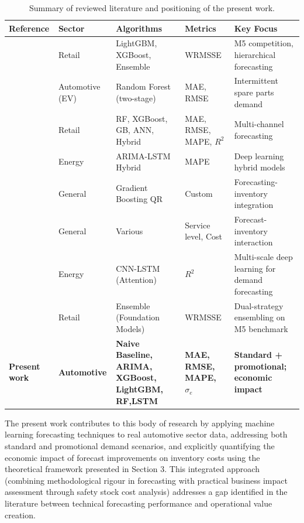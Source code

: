 \documentclass[ENG]{TFUOC}%
\begin{document}
\begin{table}[H]
\centering
\small
\caption{Summary of reviewed literature and positioning of the present work.}
\label{tab:literature_summary}
\begin{tabular}{
    |>{\raggedright\arraybackslash}p{2.6cm}
    |>{\raggedright\arraybackslash}p{2.4cm}
    |>{\raggedright\arraybackslash}p{2.4cm}
    |>{\raggedright\arraybackslash}p{2.0cm}
    |>{\raggedright\arraybackslash}p{2.6cm}|}
\hline
\textbf{Reference} & \textbf{Sector} & \textbf{Algorithms} & \textbf{Metrics} & \textbf{Key Focus} \\
\hline
\citet{makridakis2021m5} & Retail & LightGBM, XGBoost, Ensemble & WRMSSE & M5 competition, hierarchical forecasting \\
\hline
\citet{fu2026treebased} & Automotive (EV) & Random Forest (two-stage) & MAE, RMSE & Intermittent spare parts demand \\
\hline
\citet{mitra2022hybrid} & Retail & RF, XGBoost, GB, ANN, Hybrid & MAE, RMSE, MAPE, $R^2$ & Multi-channel forecasting \\
\hline
\citet{mardotillah2025hybrid} & Energy & ARIMA-LSTM Hybrid & MAPE & Deep learning hybrid models \\
\hline
\citet{ngartera2026stochastic} & General & Gradient Boosting QR & Custom & Forecasting-inventory integration \\
\hline
\citet{tiacci2009approach} & General & Various & Service level, Cost & Forecast-inventory interaction \\
\hline
\citet{debnath2026hybrid} & Energy & CNN-LSTM (Attention) & $R^2$ & Multi-scale deep learning for demand forecasting \\
\hline
\citet{yang2025foundation} & Retail & Ensemble (Foundation Models) & WRMSSE & Dual-strategy ensembling on M5 benchmark \\
\hline

\textbf{Present work} & \textbf{Automotive} & \textbf{Naive Baseline, ARIMA, XGBoost, LightGBM, RF,LSTM} & \textbf{MAE, RMSE, MAPE, $\sigma_e$} & \textbf{Standard + promotional; economic impact} \\
\hline
\end{tabular}
\end{table}



The present work contributes to this body of research by applying machine learning forecasting techniques to real automotive sector data, addressing both standard and promotional demand scenarios, and explicitly quantifying the economic impact of forecast improvements on inventory costs using the theoretical framework presented in Section 3. This integrated approach (combining methodological rigour in forecasting with practical business impact assessment through safety stock cost analysis) addresses a gap identified in the literature between technical forecasting performance and operational value creation.
\end{document}

